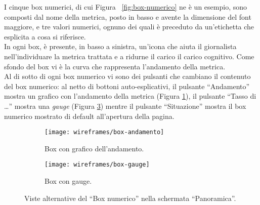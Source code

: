 \documentclass[../../../main.tex]{subfiles}
\begin{document}
I cinque box numerici, di cui Figura ~\ref{fig:box-numerico} ne è un esempio, sono composti dal nome della metrica, posto in basso e avente la dimensione del font maggiore, e tre valori numerici, ognuno dei quali è preceduto da un'etichetta che esplicita a cosa si riferisce.\\
In ogni box, è presente, in basso a sinistra, un'icona che aiuta il giornalista nell'individuare la metrica trattata e a ridurne il carico il carico cognitivo. Come sfondo del box vi è la curva che rappresenta l'andamento della metrica.\\
Al di sotto di ogni box numerico vi sono dei pulsanti che cambiano il contenuto del box numerico: al netto di bottoni auto-esplicativi, il pulsante ``Andamento'' mostra un grafico con l'andamento della metrica (Figura \ref{fig:box-andamento}), il pulsante ``Tasso di \dots'' mostra una \textit{gauge} (Figura \ref{fig:box-gauge}) mentre il pulsante ``Situazione'' mostra il box numerico mostrato di default all'apertura della pagina.

\begin{figure}[H]
    \begin{subfigure}[b]{0.5\textwidth}
        \centering
        \texttt{[image: wireframes/box-andamento]}
        \caption{Box con grafico dell'andamento.}
        \label{fig:box-andamento}
    \end{subfigure}
\hfill
    \begin{subfigure}[b]{0.51\textwidth}
        \centering
        \texttt{[image: wireframes/box-gauge]}
        \caption{Box con gauge.}
        \label{fig:box-gauge}
    \end{subfigure}
    \caption{Viste alternative del ``Box numerico'' nella schermata ``Panoramica''.}
\end{figure}
\end{document}
